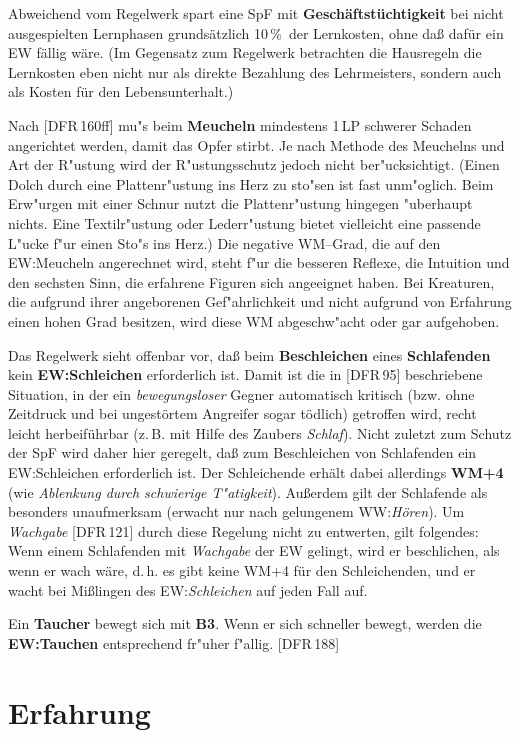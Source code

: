 \documentclass[10pt,a4paper,germanpar]{article}
\begin{document}
Abweichend vom Regelwerk spart eine SpF mit
\textbf{Geschäftstüchtigkeit} bei nicht ausgespielten Lernphasen
grund\-sätz\-lich 10\,\%\ der Lernkosten, ohne daß dafür ein EW fällig
wäre. (Im Gegensatz zum Regelwerk betrachten die Hausregeln die
Lernkosten eben nicht nur als direkte Bezahlung des Lehrmeisters,
sondern auch als Kosten für den Lebensunterhalt.)

Nach [DFR\,160ff] mu"s beim \textbf{Meucheln} mindestens 1\,LP
schwerer Schaden angerichtet werden, damit das Opfer stirbt. Je nach
Methode des Meuchelns und Art der R"ustung wird der R"ustungsschutz
jedoch nicht ber"ucksichtigt. (Einen Dolch durch eine Plattenr"ustung
ins Herz zu sto"sen ist fast unm"oglich. Beim Erw"urgen mit einer
Schnur nutzt die Plattenr"ustung hingegen "uberhaupt nichts. Eine
Textilr"ustung oder Lederr"ustung bietet vielleicht eine passende
L"ucke f"ur einen Sto"s ins Herz.) Die negative WM--Grad, die auf den
EW:Meucheln angerechnet wird, steht f"ur die besseren Reflexe, die
Intuition und den sechsten Sinn, die erfahrene Figuren sich angeeignet
haben. Bei Kreaturen, die aufgrund ihrer angeborenen Gef"ahrlichkeit
und nicht aufgrund von Erfahrung einen hohen Grad besitzen, wird diese
WM abgeschw"acht oder gar aufgehoben.

Das Regelwerk sieht offenbar vor, daß beim \textbf{Beschleichen} eines
\textbf{Schlafenden} kein \textbf{EW:Schleichen} erforderlich
ist. Damit ist die in [DFR\,95] beschriebene Situation, in der ein
\emph{bewegungsloser} Gegner automatisch kritisch (bzw. ohne Zeitdruck
und bei ungestörtem Angreifer sogar tödlich) getroffen wird, recht
leicht herbeiführbar (z.\,B. mit Hilfe des Zaubers
\emph{Schlaf}). Nicht zuletzt zum Schutz der SpF wird daher hier
geregelt, daß zum Beschleichen von Schlafenden ein EW:Schleichen
erforderlich ist. Der Schleichende erhält dabei allerdings
\textbf{WM+4} (wie \emph{Ablenkung durch schwierige
  T"atigkeit}). Außerdem gilt der Schlafende als besonders
unaufmerksam (erwacht nur nach gelungenem WW:\emph{Hören}). Um
\emph{Wachgabe} [DFR\,121] durch diese Regelung nicht zu entwerten,
gilt folgendes: Wenn einem Schlafenden mit \emph{Wachgabe} der EW
gelingt, wird er beschlichen, als wenn er wach wäre, d.\,h. es gibt
keine WM+4 für den Schleichenden, und er wacht bei Mißlingen des
EW:\emph{Schleichen} auf jeden Fall auf.

Ein \textbf{Taucher} bewegt sich mit \textbf{B3}. Wenn er sich
schneller bewegt, werden die \textbf{EW:Tauchen} entsprechend fr"uher
f"allig. [DFR\,188]

\section{Erfahrung}
\end{document}
